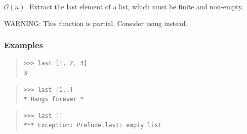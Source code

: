 \begin{haddockdesc}
\item[\begin{tabular}{@{}l}
last :: HasCallStack => {\char 91}a{\char 93} -> a
\end{tabular}]
{\haddockbegindoc
\(\mathcal{O}(n)\). Extract the last element of a list, which must be
 finite and non-empty.\par
WARNING: This function is partial. Consider using  instead.\par
\subsubsection*{\textbf{Examples}}
\begin{quote}
{\haddockverb\begin{verbatim}
>>> last [1, 2, 3]
3

\end{verbatim}}
\end{quote}
\begin{quote}
{\haddockverb\begin{verbatim}
>>> last [1..]
* Hangs forever *

\end{verbatim}}
\end{quote}
\begin{quote}
{\haddockverb\begin{verbatim}
>>> last []
*** Exception: Prelude.last: empty list

\end{verbatim}}
\end{quote}}
\end{haddockdesc}
